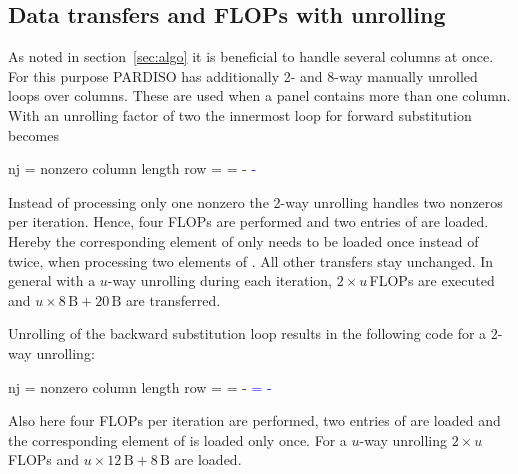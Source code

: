 \subsection{Data transfers and FLOPs with unrolling}
\label{sec:pm:dt:wu}

%
As noted in section~\ref{sec:algo} it is beneficial to handle several columns
at once.
For this purpose PARDISO has additionally 2- and 8-way manually unrolled
loops over columns.  These are used when a panel contains more than one column.
With an unrolling factor of two the innermost loop for forward substitution becomes
%
\begin{algorithmic}[1]
  \State nj = nonzero column length
      \State row = \nindx[i++]
      \State \nr[row] = \nr[row] - \nr[j] \nlnz[k] \textcolor{blue}{- \nr[j+1] \nlnz[k+nj]}
  \EndFor
\end{algorithmic}%
\noindent%
%
Instead of processing only one nonzero the 2-way unrolling handles two
nonzeros per iteration.
Hence, four FLOPs are performed and two entries of \vlnz{} are loaded.
Hereby the corresponding element of \vr{} only needs to be loaded once instead of
twice, when processing two elements of \vlnz{}.
All other transfers stay unchanged.
%
In general with a $u$-way unrolling during each iteration, $2 \times u$\,FLOPs
are executed and $u \times 8\,\text{B} + 20\,\text{B}$ are transferred.

Unrolling of the backward substitution loop results in the following code for a
$2$-way unrolling:
%
\begin{algorithmic}[1]
  \State nj = nonzero column length
      \State row = \nindx[i++]
      \State \nr[j]   = \nr[j] - \nlnz[k] \nr[row]
      \State \textcolor{blue}{\nr[j+1]   = \nr[j+1] - \nlnz[k+nj] \nr[row]}
  \EndFor
\end{algorithmic}%
\noindent%
%
Also here four FLOPs per iteration are performed, two entries of \vlnz{} are
loaded and the corresponding element of \vr{} is loaded only once.
%
For a $u$-way unrolling $2 \times u$\,FLOPs and $u \times 12\,\text{B} +
8\,\text{B}$ are loaded.

